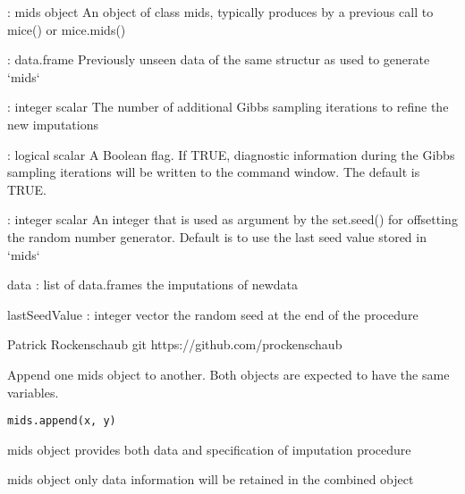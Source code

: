 \documentclass[letterpaper]{book}
\begin{document}
%
\begin{Arguments}
\begin{ldescription}
\item[\code{mids}] : mids object
An object of class mids, typically produces by a previous call to mice() or mice.mids()

\item[\code{newdata}] : data.frame
Previously unseen data of the same structur as used to generate `mids`

\item[\code{maxit}] : integer scalar
The number of additional Gibbs sampling iterations to refine the new imputations

\item[\code{printFlag}] : logical scalar
A Boolean flag. If TRUE, diagnostic information during the Gibbs sampling iterations
will be written to the command window. The default is TRUE.

\item[\code{seed}] : integer scalar
An integer that is used as argument by the set.seed() for offsetting the random
number generator. Default is to use the last seed value stored in `mids`
\end{ldescription}
\end{Arguments}
%
\begin{Value}
data : list of data.frames
the imputations of newdata


lastSeedValue : integer vector
the random seed at the end of the procedure
\end{Value}
%
\begin{Author}\relax
Patrick Rockenschaub git https://github.com/prockenschaub
\end{Author}
%
\begin{Description}\relax
Append one mids object to another. Both objects are expected to have the same variables.
\end{Description}
%
\begin{Usage}
\begin{verbatim}
mids.append(x, y)
\end{verbatim}
\end{Usage}
%
\begin{Arguments}
\begin{ldescription}
\item[\code{x}] mids object provides both data and specification of imputation procedure

\item[\code{y}] mids object only data information will be retained in the combined object
\end{ldescription}
\end{Arguments}
\end{document}
